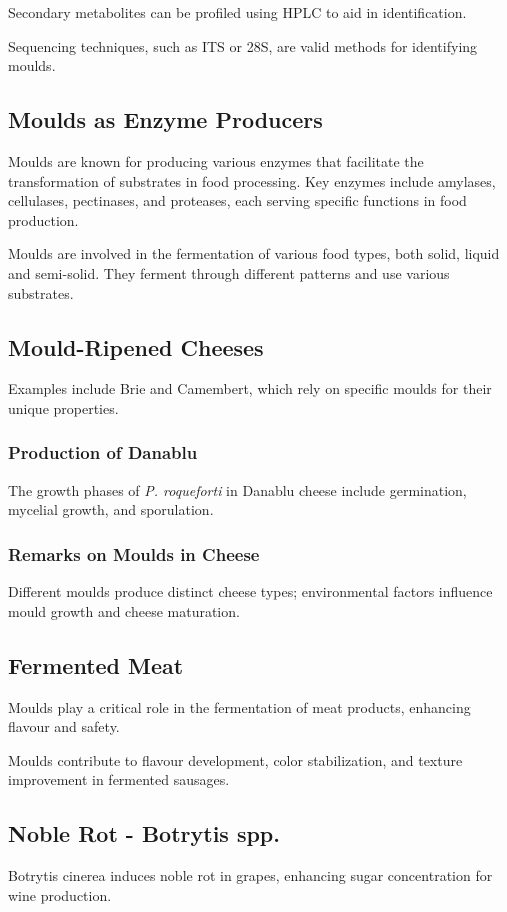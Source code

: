Secondary metabolites can be profiled using HPLC to aid in identification.

Sequencing techniques, such as ITS or 28S, are valid methods for identifying moulds. 

\subsection*{Moulds as Enzyme Producers} 
Moulds are known for producing various enzymes that facilitate the transformation of substrates in food processing. Key enzymes include amylases, cellulases, pectinases, and proteases, each serving specific functions in food production.

Moulds are involved in the fermentation of various food types, both solid, liquid and semi-solid. They ferment through different patterns and use various substrates.

\subsection*{Mould-Ripened Cheeses}
Examples include Brie and Camembert, which rely on specific moulds for their unique properties.

\subsubsection*{Production of Danablu}
The growth phases of \textit{P. roqueforti} in Danablu cheese include germination, mycelial growth, and sporulation.

\subsubsection*{Remarks on Moulds in Cheese}
Different moulds produce distinct cheese types; environmental factors influence mould growth and cheese maturation.

\subsection*{Fermented Meat}
Moulds play a critical role in the fermentation of meat products, enhancing flavour and safety.

Moulds contribute to flavour development, color stabilization, and texture improvement in fermented sausages.

\subsection*{Noble Rot - Botrytis spp.} 
Botrytis cinerea induces noble rot in grapes, enhancing sugar concentration for wine production.


